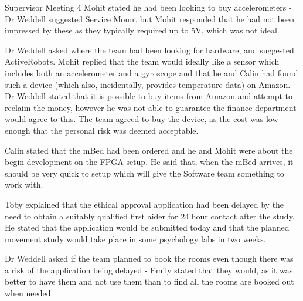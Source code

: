 \documentclass{article}
\begin{document}
\begin{Minutes}{Supervisor Meeting 4}
Mohit stated he had been looking to buy accelerometers - Dr Weddell suggested Service Mount but Mohit responded that he had not been impressed by these as they typically required up to 5V, which was not ideal.

Dr Weddell asked where the team had been looking for hardware, and suggested ActiveRobots. Mohit replied that the team would ideally like a sensor which includes both an accelerometer and a gyroscope and that he and Calin had found such a device (which also, incidentally, provides temperature data) on Amazon. Dr Weddell stated that it is possible to buy items from Amazon and attempt to reclaim the money, however he was not able to guarantee the finance department would agree to this.
The team agreed to buy the device, as the cost was low enough that the personal risk was deemed acceptable.


Calin stated that the mBed had been ordered and he and Mohit were about the begin development on the FPGA setup.
He said that, when the mBed arrives, it should be very quick to setup which will give the Software team something to work with.

Toby explained that the ethical approval application had been delayed by the need to obtain a suitably qualified first aider for 24 hour contact after the study.
He stated that the application would be submitted today and that the planned movement study would take place in some psychology labs in two weeks.

Dr Weddell asked if the team planned to book the rooms even though there was a risk of the application being delayed -
Emily stated that they would, as it was better to have them and not use them than to find all the rooms are booked out when needed.


\end{Minutes}
\end{document}
